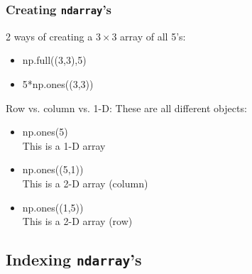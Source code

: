 \documentclass{beamer}
\newcommand{\code}[1]{\texttt{#1}}
\begin{document}
\begin{frame}	
	\frametitle{Creating \code{ndarray}'s}
	
	\begin{exampleblock}{2 ways of creating a $3\times3$ array of all 5's:}
		\begin{itemize}
			\item np.full((3,3),5)
			\item 5*np.ones((3,3))
		\end{itemize}
	\end{exampleblock}
	
	\begin{exampleblock}{Row vs. column vs. 1-D:}
		These are all different objects:
		\begin{itemize}
			\item np.ones(5) \\
					This is a 1-D array
			\item np.ones((5,1)) \\
					This is a 2-D array (column)
			\item np.ones((1,5)) \\
					This is a 2-D array (row)
		\end{itemize}
	\end{exampleblock}
	
\end{frame}

\subsection{Indexing \code{ndarray}'s}
\end{document}

